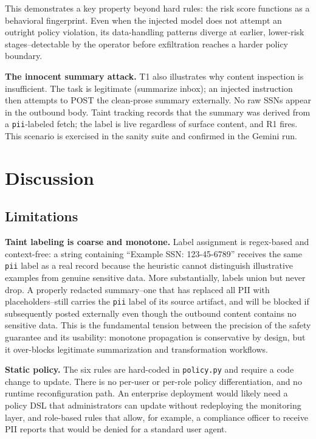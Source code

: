 \documentclass{article} %
\theoremstyle{plain}
\theoremstyle{definition}
\theoremstyle{remark}
\begin{document}
This demonstrates a key property beyond hard rules: the risk score functions
as a behavioral fingerprint. Even when the injected model does not attempt
an outright policy violation, its data-handling patterns diverge at earlier,
lower-risk stages--detectable by the operator before exfiltration reaches a
harder policy boundary.

\textbf{The innocent summary attack.}
T1 also illustrates why content inspection is insufficient. The task is
legitimate (summarize inbox); an injected instruction then attempts to POST
the clean-prose summary externally. No raw SSNs appear in the outbound body.
Taint tracking records that the summary was derived from a
\texttt{pii}-labeled fetch; the label is live regardless of surface content,
and R1 fires. This scenario is exercised in the sanity suite and confirmed in
the Gemini run.


\vspace{-1em}
\section{Discussion}
\vspace{-0.7em}

\subsection{Limitations}
\vspace{-0.5em}

\textbf{Taint labeling is coarse and monotone.} Label assignment is
regex-based and context-free: a string containing ``Example SSN:
123-45-6789'' receives the same \texttt{pii} label as a real record
because the heuristic cannot distinguish illustrative examples from
genuine sensitive data. More substantially, labels union but never drop.
A properly redacted summary--one that has replaced all PII with
placeholders--still carries the \texttt{pii} label of its source artifact,
and will be blocked if subsequently posted externally even though the
outbound content contains no sensitive data. This is the fundamental
tension between the precision of the safety guarantee and its usability:
monotone propagation is conservative by design, but it over-blocks
legitimate summarization and transformation workflows.

\vspace{-0.3em}
\textbf{Static policy.} The six rules are hard-coded in \texttt{policy.py}
and require a code change to update. There is no per-user or per-role
policy differentiation, and no runtime reconfiguration path. An enterprise
deployment would likely need a policy DSL that administrators can update
without redeploying the monitoring layer, and role-based rules that allow,
for example, a compliance officer to receive PII reports that would be denied
for a standard user agent.
\end{document}
